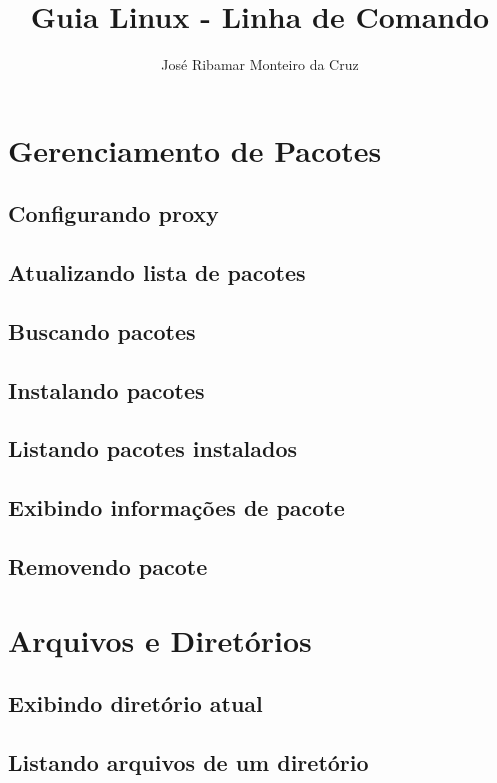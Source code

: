 \documentclass[a4paper,8pt]{extarticle}
\begin{document}
\title{Guia Linux - Linha de Comando}
\author{José Ribamar Monteiro da Cruz}
\maketitle
\tableofcontents



\begin{multicols}{2}
\section{Gerenciamento de Pacotes}
\subsection{Configurando proxy}
\subsection{Atualizando lista de pacotes}
\subsection{Buscando pacotes}
\subsection{Instalando pacotes}
\subsection{Listando pacotes instalados}
\subsection{Exibindo informações de pacote}
\subsection{Removendo pacote}
 
\section{Arquivos e Diretórios}
\subsection{Exibindo diretório atual}
\subsection{Listando arquivos de um diretório}

\end{multicols}
\end{document}
